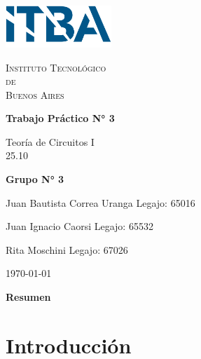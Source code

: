 \documentclass{article}
\newcommand{\Facultad}{Instituto Tecnológico \\de\\ Buenos Aires} %
\newcommand{\TPn}{Trabajo Práctico N° 3}
\begin{document}
\begin{titlepage} %

        \begin{flushleft}
            \centering
            \includegraphics[width=0.3\textwidth]{Logo_ITBA.png}
        \end{flushleft}

        \centering
            
        {\scshape\LARGE \Facultad \par} %
        \vspace{1cm}                    %


        {\huge\bfseries \TPn \par}
        \vspace{1.5cm}
        {\Large Teoría de Circuitos I\\ 25.10 \par}
        \vfill                      %
        {\Large \bfseries Grupo N° 3 \par}
        \vspace{1cm}
        {\large Juan Bautista Correa Uranga \hfill Legajo: 65016 \par} %
        {\large Juan Ignacio Caorsi \hfill Legajo: 65532  \par}
        {\large Rita Moschini \hfill Legajo: 67026 \par} 
        \vfill
        {\large \today\par}
        \vfill

    \end{titlepage}

{\centering \LARGE \bfseries Resumen \par}


\newpage

\tableofcontents %
\newpage

\section{Introducción}
\end{document}
